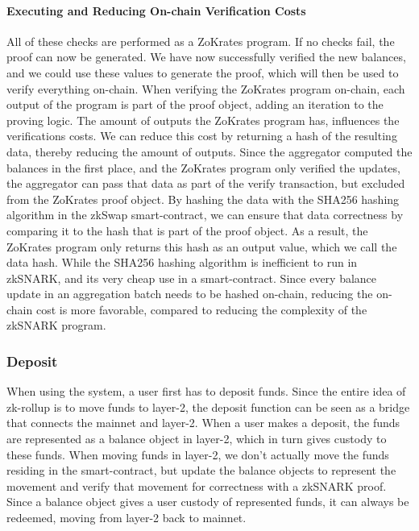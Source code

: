 \documentclass[../../thesis.tex]{subfiles}
\begin{document}
\paragraph{Executing and Reducing On-chain Verification Costs} \label{exec_and_reduce}
All of these checks are performed as a ZoKrates program. If no checks fail, the proof can now be generated.  We have now successfully verified the new balances, and we could use these values to generate the proof, which will then be used to verify everything on-chain. When verifying the ZoKrates program on-chain, each output of the program is part of the proof object, adding an iteration to the proving logic. The amount of outputs the ZoKrates program has, influences the verifications costs. We can reduce this cost by returning a hash of the resulting data, thereby reducing the amount of outputs. Since the aggregator computed the balances in the first place, and the ZoKrates program only verified the updates, the aggregator can pass that data as part of the verify transaction, but excluded from the ZoKrates proof object. By hashing the data with the SHA256 hashing algorithm in the zkSwap smart-contract, we can ensure that data correctness by comparing it to the hash that is part of the proof object. As a result, the ZoKrates program only returns this hash as an output value, which we call the data hash. While the SHA256 hashing algorithm is inefficient to run in zkSNARK, and its very cheap use in a smart-contract. Since every balance update in an aggregation batch needs to be hashed on-chain, reducing the on-chain cost is more favorable, compared to reducing the complexity of the zkSNARK program. 

\subsubsection{Deposit}
When using the system, a user first has to deposit funds. Since the entire idea of zk-rollup is to move funds to layer-2, the deposit function can be seen as a bridge that connects the mainnet and layer-2. When a user makes a deposit, the funds are represented as a balance object in layer-2, which in turn gives custody to these funds. When moving funds in layer-2, we don't actually move the funds residing in the smart-contract, but update the balance objects to represent the movement and verify that movement for correctness with a zkSNARK proof. Since a balance object gives a user custody of represented funds, it can always be redeemed, moving from layer-2 back to mainnet.  
\end{document}
